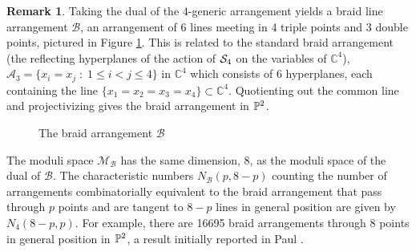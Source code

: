 \documentclass[12pt]{article}
\theoremstyle{plain}
\theoremstyle{definition}
\newtheorem{remark}[theorem]{Remark}
\newcommand{\A}{\mathcal{A}}
\newcommand{\M}{\mathcal{M}}
\newcommand{\C}{\mathbb{C}}
\renewcommand{\P}{\ensuremath \mathbb{P}}
\renewcommand{\S}{\ensuremath \mathcal{S}}
\begin{document}
\begin{remark} \label{braidr}
Taking the dual of the $4$-generic arrangement yields a braid line
arrangement $\mathcal{B}$, an arrangement of $6$ lines meeting in 4 triple points
and 3 double points, pictured in Figure \ref{braid}. This is related
to the standard braid arrangement (the reflecting hyperplanes of the
action of $\S_4$ on the variables of $\C^4$), $\A_3 = \{x_i = x_j \; : \; 1 \leq i
< j \leq 4\}$ in $\C^4$ which consists of 6 hyperplanes, each
containing the line $\{x_1=x_2=x_3=x_4\} \subset \C^4$. Quotienting
out the common line and projectivizing gives the braid arrangement in $\P^2$. 


\begin{figure}[h!t]
\begin{center}
\end{center}
\caption{The braid arrangement $\mathcal{B}$ } \label{braid}
\end{figure}

The moduli space $\M_\mathcal{B}$ has the same dimension, 8, as the
moduli space of the dual of $\mathcal{B}$. The characteristic numbers
$N_\mathcal{B}(p,8-p)$ counting the number of arrangements
combinatorially equivalent to the braid arrangement that pass through
$p$ points and are tangent to $8-p$ lines in general position are
given by $N_4(8-p,p)$. For example, there are 16695 braid arrangements
through 8 points in general position in $\P^2$, a result initially
reported in Paul \cite{Paul}.
\end{remark}
\end{document}
